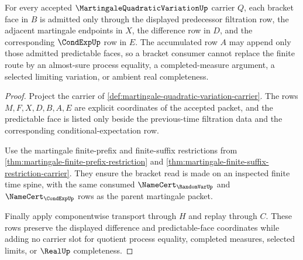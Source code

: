 \begin{theorem}
\label{thm:martingale-quadratic-variation-predictable-bracket}
For every accepted $\MartingaleQuadraticVariationUp$ carrier $Q$, each bracket face in $B$ is admitted only through the displayed predecessor filtration row, the adjacent martingale endpoints in $X$, the difference row in $D$, and the corresponding $\CondExpUp$ row in $E$. The accumulated row $A$ may append only those admitted predictable faces, so a bracket consumer cannot replace the finite route by an almost-sure process equality, a completed-measure argument, a selected limiting variation, or ambient real completeness.
\end{theorem}
\begin{proof}
Project the carrier of \autoref{def:martingale-quadratic-variation-carrier}. The rows $M,F,X,D,B,A,E$ are explicit coordinates of the accepted packet, and the predictable face is listed only beside the previous-time filtration data and the corresponding conditional-expectation row.

Use the martingale finite-prefix and finite-suffix restrictions from \autoref{thm:martingale-finite-prefix-restriction} and \autoref{thm:martingale-finite-suffix-restriction-carrier}. They ensure the bracket read is made on an inspected finite time spine, with the same consumed $\NameCert_{\RandomVarUp}$ and $\NameCert_{\CondExpUp}$ rows as the parent martingale packet.

Finally apply componentwise transport through $H$ and replay through $C$. These rows preserve the displayed difference and predictable-face coordinates while adding no carrier slot for quotient process equality, completed measures, selected limits, or $\RealUp$ completeness.
\end{proof}

